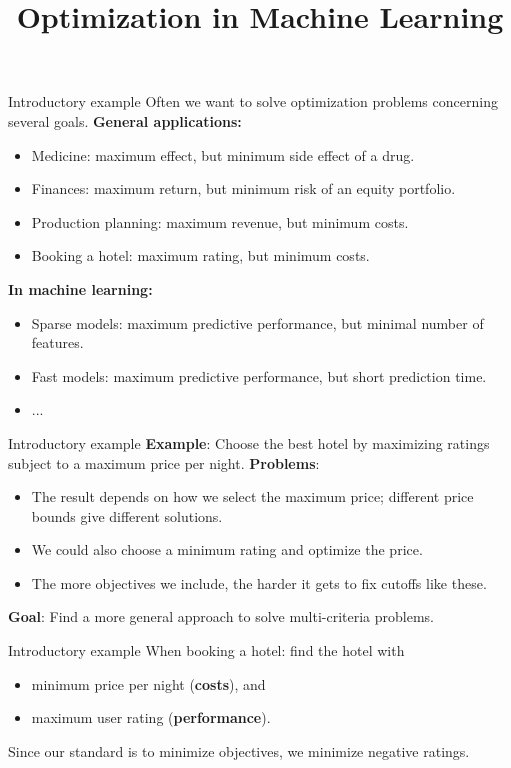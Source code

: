 \documentclass[11pt,compress,t,notes=noshow,xcolor=table]{beamer}
\title{Optimization in Machine Learning}
\begin{document}

\begin{framev}{Introductory example}
Often we want to solve optimization problems concerning several goals.
\spacer
\textbf{General applications:}
\begin{itemize}
\item Medicine: maximum effect, but minimum side effect of a drug.
\item Finances: maximum return, but minimum risk of an equity portfolio.
\item Production planning: maximum revenue, but minimum costs.
\item Booking a hotel: maximum rating, but minimum costs.
\end{itemize}
\spacer
\textbf{In machine learning:}
\begin{itemize}
\item Sparse models: maximum predictive performance, but minimal number of features.
\item Fast models: maximum predictive performance, but short prediction time.
\item ...
\end{itemize}
\end{framev}


\begin{framev}{Introductory example}
\textbf{Example}: Choose the best hotel by maximizing ratings subject to a maximum price per night.
\spacer
\textbf{Problems}:
\begin{itemize}
\item The result depends on how we select the maximum price; different price bounds give different solutions.
\item We could also choose a minimum rating and optimize the price.
\item The more objectives we include, the harder it gets to fix cutoffs like these.
\end{itemize}
\spacer
\textbf{Goal}: Find a more general approach to solve multi-criteria problems.
\end{framev}


\begin{framev}{Introductory example}
\vfill
When booking a hotel: find the hotel with
\begin{itemize}
\item minimum price per night (\textbf{costs}), and
\item maximum user rating (\textbf{performance}).
\end{itemize}
\begin{footnotesize}
Since our standard is to minimize objectives, we minimize negative ratings.
\end{footnotesize}
\end{framev}
\end{document}
